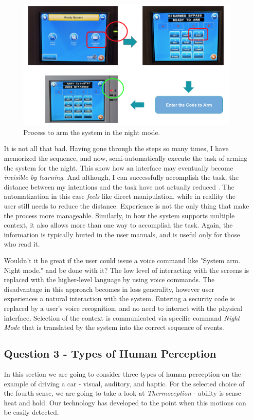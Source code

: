 \documentclass[12pt,letterpaper]{article}
\begin{document}
\begin{figure}[h]
\centering
\includegraphics[scale=.5]{figures/p2/alarm.png}
\caption{Process to arm the system in the night mode.}
\label{fig::3}
\end{figure}

It is not all that bad. Having gone through the steps so many times, I have memorized the sequence, and now, semi-automatically execute the task of arming the system for the night. This show how an interface may eventually become \textit{invisible by learning}. And although, I can successfully accomplish the task, the distance between my intentions and the task have not actually reduced \cite{hutchins1985direct}. The automatization in this case \textit{feels} like direct manipulation, while in reallity the user still needs to reduce the distance. Experience is not the only thing that make the process more manageable. Similarly, in how the system supports multiple context, it also allows more than one way to accomplish the task. Again, the information is typically buried in the user manuals, and is useful only for those who read it.

Wouldn't it be great if the user could issue a voice command like "System arm. Night mode." and be done with it? The low level of interacting with the screens is replaced with the higher-level language by using voice commands. The disadvantage in this approach becomes in loss generality, however user experiences a natural interaction with the system. Entering a security code is replaced by a user's voice recognition, and no need to interact with the physical interface. Selection of the context is communicated via specific command \textit{Night Mode} that is translated by the system into the correct sequence of events.

\subsection*{Question 3 - Types of Human Perception}
In this section we are going to consider three types of human perception on the example of driving a car - visual, auditory, and haptic. For the selected choice of the fourth sense, we are going to take a look at \textit{Thermoception} - ability is sense heat and hold. Our technology has developed to the point when this motions can be easily detected. 
\end{document}
